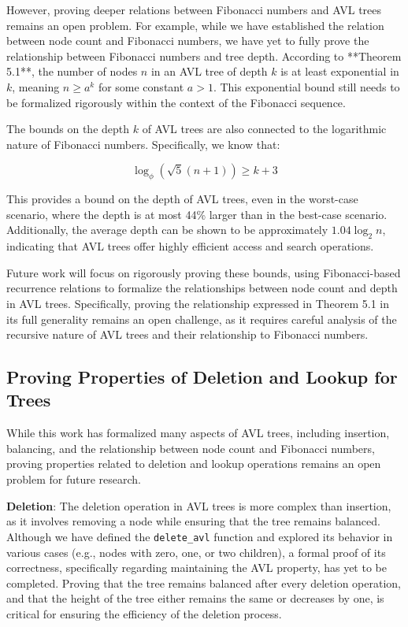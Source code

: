 \documentclass[12pt]{article}
\begin{document}
\begin{itemize}
However, proving deeper relations between Fibonacci numbers and AVL trees remains an open problem. For example, while we have established the relation between node count and Fibonacci numbers, we have yet to fully prove the relationship between Fibonacci numbers and tree depth. According to **Theorem 5.1**, the number of nodes \( n \) in an AVL tree of depth \( k \) is at least exponential in \( k \), meaning \( n \geq a^k \) for some constant \( a > 1 \). This exponential bound still needs to be formalized rigorously within the context of the Fibonacci sequence.

The bounds on the depth \( k \) of AVL trees are also connected to the logarithmic nature of Fibonacci numbers. Specifically, we know that:

\[
\log_\phi \left( \sqrt{5}(n + 1) \right) \geq k + 3
\]

This provides a bound on the depth of AVL trees, even in the worst-case scenario, where the depth is at most 44\% larger than in the best-case scenario. Additionally, the average depth can be shown to be approximately \( 1.04 \log_2 n \), indicating that AVL trees offer highly efficient access and search operations.

Future work will focus on rigorously proving these bounds, using Fibonacci-based recurrence relations to formalize the relationships between node count and depth in AVL trees. Specifically, proving the relationship expressed in Theorem 5.1 in its full generality remains an open challenge, as it requires careful analysis of the recursive nature of AVL trees and their relationship to Fibonacci numbers.


\subsection*{Proving Properties of Deletion and Lookup for Trees}

While this work has formalized many aspects of AVL trees, including insertion, balancing, and the relationship between node count and Fibonacci numbers, proving properties related to deletion and lookup operations remains an open problem for future research.

\textbf{Deletion}: The deletion operation in AVL trees is more complex than insertion, as it involves removing a node while ensuring that the tree remains balanced. Although we have defined the \texttt{delete\_avl} function and explored its behavior in various cases (e.g., nodes with zero, one, or two children), a formal proof of its correctness, specifically regarding maintaining the AVL property, has yet to be completed. Proving that the tree remains balanced after every deletion operation, and that the height of the tree either remains the same or decreases by one, is critical for ensuring the efficiency of the deletion process.


\end{itemize}
\end{document}
